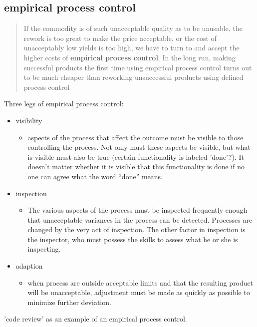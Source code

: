 \subsection{empirical process control}

\begin{quotation}
  If the commodity is of such unacceptable
  quality as to be unusable, the rework is too great to make the price acceptable,
  or the cost of unacceptably low yields is too high, we have to turn to and accept
  the higher costs of \textbf{empirical process control}.
  In the long run, making successful
  products the first time using empirical process control turns out to be much
  cheaper than reworking unsuccessful products using defined process control
\end{quotation}

Three legs of empirical process control:
\begin{itemize}
  \item visibility
  \begin{itemize}
    \item aspects of the process that affect the outcome must be visible to those controlling
    the process. Not only must these aspects be visible, but what is visible must
    also be true (certain functionality is labeled 'done'?). It doesn’t matter whether it is visible that this functionality
    is done if no one can agree what the word “done” means.
  \end{itemize}
  \item inspection
  \begin{itemize}
    \item The various aspects of the process must be
    inspected frequently enough that unacceptable variances in the process can be
    detected. Processes are changed by the very act of inspection. The other factor in
    inspection is the inspector, who must possess the skills to assess what he or she
    is inspecting.
  \end{itemize}
  \item adaption
  \begin{itemize}
    \item when process are outside acceptable limits and that the resulting product will be unacceptable, adjustment
    must be made as quickly as possible to minimize further deviation.
  \end{itemize}
\end{itemize}

'code review' as an example of an empirical process control.